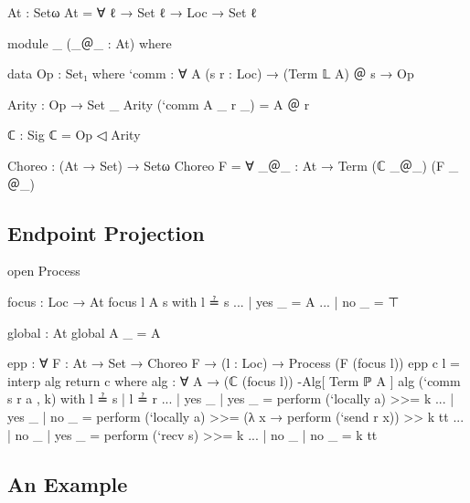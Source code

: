 \begin{code}
At : Setω
At = ∀ {ℓ} → Set ℓ → Loc → Set ℓ
\end{code}

\begin{code}
module _ (_＠_ : At) where

  data Op : Set₁ where
    `comm : ∀ {A} (s r : Loc) → (Term 𝕃 A) ＠ s → Op

  Arity : Op → Set _
  Arity (`comm {A} _ r _) = A ＠ r

  ℂ : Sig
  ℂ = Op ◁ Arity

Choreo : (At → Set) → Setω
Choreo F = ∀ {_＠_ : At} → Term (ℂ _＠_) (F _＠_)
\end{code}

\subsection{Endpoint Projection}

\begin{code}[hide]
open Process
\end{code}

\begin{code}
focus : Loc → At
focus l A s with l ≟ s
... | yes _ = A
... | no  _ = ⊤

global : At
global A _ = A

epp : ∀ {F : At → Set} → Choreo F → (l : Loc) → Process (F (focus l))
epp c l = interp alg return c
  where
  alg : ∀ {A} → (ℂ (focus l)) -Alg[ Term ℙ A ]
  alg (`comm s r a , k) with l ≟ s | l ≟ r
  ... | yes _ | yes _ = perform (`locally a) >>= k
  ... | yes _ | no  _ = perform (`locally a) >>= (λ x → perform (`send r x)) >> k tt
  ... | no  _ | yes _ = perform (`recv s) >>= k
  ... | no  _ | no  _ = k tt
\end{code}

\subsection{An Example}
